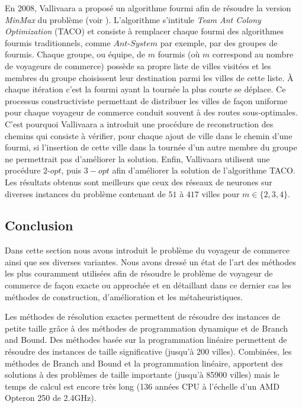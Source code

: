 En 2008, Vallivaara a proposé un algorithme fourmi afin de résoudre la version \textit{MinMax} du problème (voir \cite{Vallivaara2008}). L'algorithme s'intitule \textit{Team Ant Colony Optimization} (TACO) et consiste à remplacer chaque fourmi des algorithmes fourmis traditionnels, comme $Ant$-$System$ par exemple, par des groupes de fourmis.
Chaque groupe, ou équipe, de $m$ fourmis (où $m$ correspond au nombre de voyageurs de commerce) possède sa propre liste de villes visitées et les membres du groupe choisissent leur destination parmi les villes de cette liste. À chaque itération c'est la fourmi ayant la tournée la plus courte se déplace. Ce processus constructiviste permettant de distribuer les villes de façon uniforme pour chaque voyageur de commerce conduit souvent à des routes sous-optimales. C'est pourquoi Vallivaara a introduit une procédure de reconstruction des chemins qui consiste à vérifier, pour chaque ajout de ville dans le chemin d'une fourmi, si l'insertion de cette ville dans la tournée d'un autre membre du groupe ne permettrait pas d'améliorer la solution.
Enfin, Vallivaara utilisent une procédure $2$-$opt$, puis $3-opt$ afin d'améliorer la solution de l'algorithme TACO. 
Les résultats obtenus sont meilleurs que ceux des réseaux de neurones sur diverses instances du problème contenant de $51$ à $417$ villes pour $m \in \{2,3,4\}$.

\subsection*{Conclusion}

Dans cette section nous avons introduit le problème du voyageur de commerce ainsi que ses diverses variantes. Nous avons dressé un état de l'art des méthodes les plus couramment utilisées afin de résoudre le problème de voyageur de commerce de façon exacte ou approchée et en détaillant dans ce dernier cas les méthodes de construction, d'amélioration et les métaheuristiques.

Les méthodes de résolution exactes permettent de résoudre des instances de petite taille  grâce à des méthodes de programmation dynamique et de Branch and Bound. Des méthodes basée sur la programmation linéaire permettent de résoudre des instances de taille significative (jusqu'à 200 villes). Combinées, les méthodes de Branch and Bound et la programmation linéaire, apportent des solutions à des problèmes de taille importante (jusqu'à 85900 villes) mais le temps de calcul est encore très long (136 années CPU à l'échelle d'un AMD Opteron 250 de 2.4GHz).

